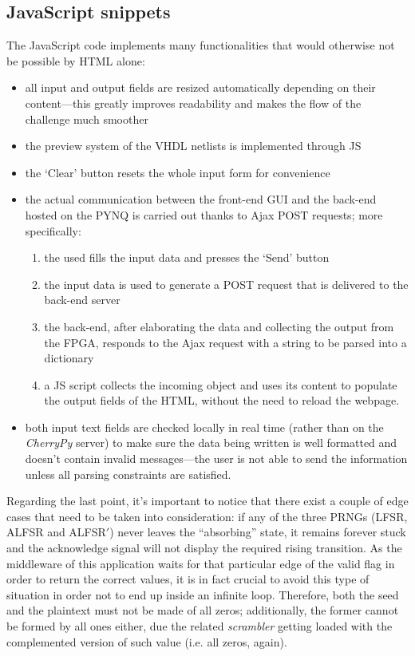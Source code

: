 \subsection{JavaScript snippets}
The JavaScript code implements many functionalities that would otherwise not be possible by HTML alone:
\begin{itemize}
\item all input and output fields are resized automatically depending on their content---this greatly improves readability and makes the flow of the challenge much smoother
\item the preview system of the VHDL netlists is implemented through JS
\item the `Clear' button resets the whole input form for convenience
\item the actual communication between the front-end GUI and the back-end hosted on the PYNQ is carried out thanks to Ajax POST requests; more specifically:
        \begin{enumerate}
        \item the used fills the input data and presses the `Send' button
        \item the input data is used to generate a POST request that is delivered to the back-end server
        \item the back-end, after elaborating the data and collecting the output from the FPGA, responds to the Ajax request with a string to be parsed into a dictionary
        \item a JS script collects the incoming object and uses its content to populate the output fields of the HTML, without the need to reload the webpage.
        \end{enumerate}
\item both input text fields are checked locally in real time (rather than on the \emph{CherryPy} server) to make sure the data being written is well formatted and doesn't contain invalid messages---the user is not able to send the information unless all parsing constraints are satisfied.
\end{itemize}
Regarding the last point, it's important to notice that there exist a couple of edge cases that need to be taken into consideration: if any of the three PRNGs (LFSR, ALFSR and ALFSR$'$) never leaves the ``absorbing'' state, it remains forever stuck and the acknowledge signal will not display the required rising transition.
As the middleware of this application waits for that particular edge of the valid flag in order to return the correct values, it is in fact crucial to avoid this type of situation in order not to end up inside an infinite loop.
Therefore, both the seed and the plaintext must not be made of all zeros; additionally, the former cannot be formed by all ones either, due the related \emph{scrambler} getting loaded with the complemented version of such value (i.e. all zeros, again).

